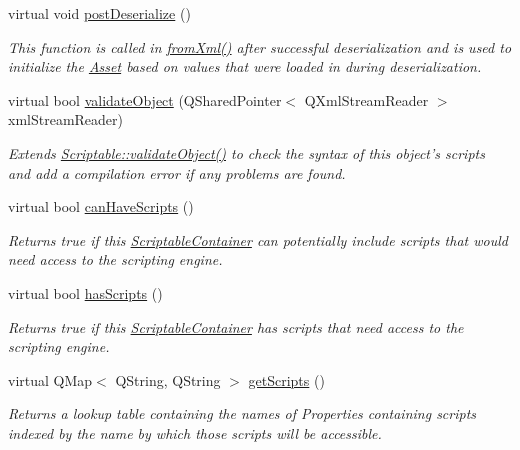\begin{DoxyCompactItemize}
\item 
virtual void \hyperlink{class_picto_1_1_script_element_a673c95614169016369b9f69516a73134}{post\-Deserialize} ()
\begin{DoxyCompactList}\small\item\em This function is called in \hyperlink{class_picto_1_1_asset_a8bed4da09ecb1c07ce0dab313a9aba67}{from\-Xml()} after successful deserialization and is used to initialize the \hyperlink{class_picto_1_1_asset}{Asset} based on values that were loaded in during deserialization. \end{DoxyCompactList}\item 
\hypertarget{class_picto_1_1_script_element_a1af92afd8e8b081c8f394ea51449419f}{virtual bool \hyperlink{class_picto_1_1_script_element_a1af92afd8e8b081c8f394ea51449419f}{validate\-Object} (Q\-Shared\-Pointer$<$ Q\-Xml\-Stream\-Reader $>$ xml\-Stream\-Reader)}\label{class_picto_1_1_script_element_a1af92afd8e8b081c8f394ea51449419f}

\begin{DoxyCompactList}\small\item\em Extends \hyperlink{class_picto_1_1_scriptable_ab6e2944c43a3b5d418bf7b251594386d}{Scriptable\-::validate\-Object()} to check the syntax of this object's scripts and add a compilation error if any problems are found. \end{DoxyCompactList}\item 
\hypertarget{class_picto_1_1_script_element_ad385c5c2dc81243a112fc21afda710cc}{virtual bool \hyperlink{class_picto_1_1_script_element_ad385c5c2dc81243a112fc21afda710cc}{can\-Have\-Scripts} ()}\label{class_picto_1_1_script_element_ad385c5c2dc81243a112fc21afda710cc}

\begin{DoxyCompactList}\small\item\em Returns true if this \hyperlink{class_picto_1_1_scriptable_container}{Scriptable\-Container} can potentially include scripts that would need access to the scripting engine. \end{DoxyCompactList}\item 
virtual bool \hyperlink{class_picto_1_1_script_element_a6823bbcbdfaa8a2035c55f78523441be}{has\-Scripts} ()
\begin{DoxyCompactList}\small\item\em Returns true if this \hyperlink{class_picto_1_1_scriptable_container}{Scriptable\-Container} has scripts that need access to the scripting engine. \end{DoxyCompactList}\item 
virtual Q\-Map$<$ Q\-String, Q\-String $>$ \hyperlink{class_picto_1_1_script_element_af86fb66166dcdb35966b148ab16bf3f1}{get\-Scripts} ()
\begin{DoxyCompactList}\small\item\em Returns a lookup table containing the names of Properties containing scripts indexed by the name by which those scripts will be accessible. \end{DoxyCompactList}\end{DoxyCompactItemize}
